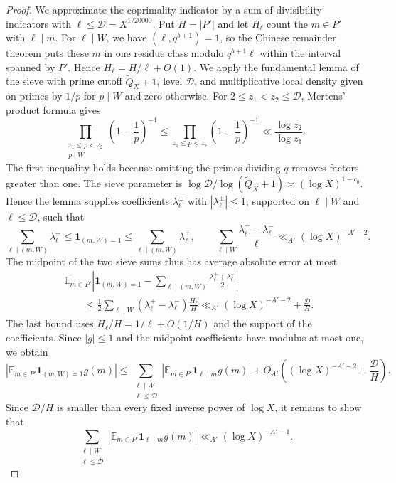 \documentclass[12pt]{amsart}
\newcommand{\1}{\mathbf 1}
\theoremstyle{definition}
\begin{document}
\begin{proof}
We approximate the coprimality indicator by a sum of divisibility
indicators with $\ell\leq\mathcal D=X^{1/20000}$. Put $H=|P'|$
and let $H_\ell$ count the $m\in P'$ with $\ell\mid m$. For
$\ell\mid W$, we have $(\ell,q^{b+1})=1$, so the Chinese
remainder theorem puts these $m$ in one residue class modulo
$q^{b+1}\ell$ within the interval spanned by $P'$.  Hence $H_\ell=H/\ell+O(1)$. We apply the fundamental lemma of the sieve
\cite[Lemma~6.3]{IwaniecKowalski} with prime cutoff
$\widetilde Q_X+1$, level $\mathcal D$, and multiplicative local
density given on primes by $1/p$ for $p\mid W$ and zero otherwise.
For \(2\leq z_1<z_2\leq \mathcal D\), Mertens' product
formula gives
\[
 \prod_{\substack{z_1\leq p<z_2\\p\mid W}}
       \left(1-\frac1p\right)^{-1}
 \leq
 \prod_{z_1\leq p<z_2}\left(1-\frac1p\right)^{-1}
 \ll \frac{\log z_2}{\log z_1}.
\]
The first inequality holds because omitting the primes dividing
\(q\) removes factors greater than one.  The sieve parameter is
\(\log\mathcal D/\log(\widetilde Q_X+1)
\asymp(\log X)^{1-c_0}\). Hence the lemma supplies coefficients
\(\lambda_\ell^\pm\) with \(|\lambda_\ell^\pm|\leq1\), supported
on \(\ell\mid W\) and \(\ell\leq\mathcal D\), such that
\[
 \sum_{\ell\mid(m,W)}\lambda_\ell^-
 \leq\mathbf1_{(m,W)=1}
 \leq\sum_{\ell\mid(m,W)}\lambda_\ell^+,
 \qquad
 \sum_{\ell\mid W}\frac{\lambda_\ell^+-\lambda_\ell^-}{\ell}
 \ll_{A'}(\log X)^{-A'-2}.
\]
The midpoint of the two sieve sums thus has average absolute
error at most
\[
\begin{aligned}
 &\mathbb E_{m\in P'}
 \left|\mathbf1_{(m,W)=1}
       -\sum_{\ell\mid(m,W)}
         \frac{\lambda_\ell^++\lambda_\ell^-}{2}\right|\\
 &\qquad\leq
 \frac12\sum_{\ell\mid W}
    (\lambda_\ell^+-\lambda_\ell^-)\frac{H_\ell}{H}
 \ll_{A'}(\log X)^{-A'-2}+\frac{\mathcal D}{H}.
\end{aligned}
\]
The last bound uses $H_\ell/H=1/\ell+O(1/H)$ and the support
of the coefficients. Since $|g|\leq1$ and the midpoint
coefficients have modulus at most one, we obtain
\[
 \left|\mathbb E_{m\in P'}\mathbf1_{(m,W)=1}g(m)\right|
 \leq
 \sum_{\substack{\ell\mid W\\\ell\leq\mathcal D}}
 \left|\mathbb E_{m\in P'}\mathbf1_{\ell\mid m}g(m)\right|
 +O_{A'}\!\left((\log X)^{-A'-2}+\frac{\mathcal D}{H}\right).
\]
Since $\mathcal D/H$ is smaller than every fixed inverse power
of $\log X$,  it remains to show that
\[
 \sum_{\substack{\ell\mid W\\\ell\leq\mathcal D}}
 \left|\mathbb E_{m\in P'}\mathbf1_{\ell\mid m}g(m)\right|
 \ll_{A'}(\log X)^{-A'-1}.
\]


\end{proof}
\end{document}
